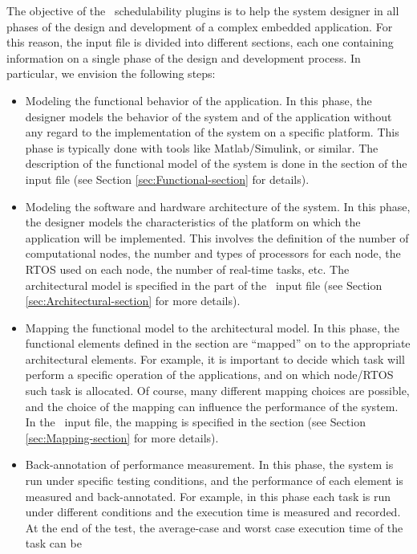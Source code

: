 The objective of the \rtd\ schedulability plugins is to help the
system designer in all phases of the design and development of a
complex embedded application. For this reason, the input file is
divided into different sections, each one containing information on a
single phase of the design and development process. In particular, we
envision the following steps:
\begin{itemize}
\item Modeling the functional behavior of the application. In this
  phase, the designer models the behavior of the system and of the
  application without any regard to the implementation of the system
  on a specific platform. This phase is typically done with tools like
  Matlab/Simulink, or similar. The description of the functional model
  of the system is done in the  section of the input
  file (see Section \ref{sec:Functional-section} for details).
\item Modeling the software and hardware architecture of the
  system. In this phase, the designer models the characteristics of
  the platform on which the application will be implemented. This
  involves the definition of the number of computational nodes, the
  number and types of processors for each node, the RTOS used on each
  node, the number of real-time tasks, etc. The architectural model is
  specified in the  part of the \rtd\ input file
  (see Section \ref{sec:Architectural-section} for more details).
\item Mapping the functional model to the architectural model. In this
  phase, the functional elements defined in the 
  section are ``mapped'' on to the appropriate architectural
  elements. For example, it is important to decide which task will
  perform a specific operation of the applications, and on which
  node/RTOS such task is allocated. Of course, many different mapping
  choices are possible, and the choice of the mapping can influence
  the performance of the system. In the \rtd\ input file, the mapping
  is specified in the  section (see Section
  \ref{sec:Mapping-section} for more details).
\item Back-annotation of performance measurement. In this phase, the
  system is run under specific testing conditions, and the performance
  of each element is measured and back-annotated. For example, in this
  phase each task is run under different conditions and the execution
  time is measured and recorded. At the end of the test, the
  average-case and worst case execution time of the task can be

\end{itemize}
